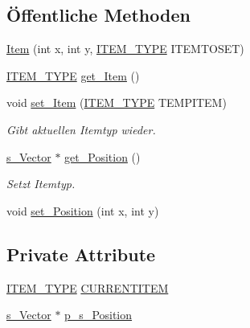\subsection*{Öffentliche Methoden}
\begin{DoxyCompactItemize}
\item 
\hyperlink{class_item_ae203ad5350de1aa73defd90973e055f0}{Item} (int x, int y, \hyperlink{globals_8h_a025279585f93967b0c7184f5b8597490}{I\-T\-E\-M\-\_\-\-T\-Y\-P\-E} I\-T\-E\-M\-T\-O\-S\-E\-T)
\item 
\hyperlink{globals_8h_a025279585f93967b0c7184f5b8597490}{I\-T\-E\-M\-\_\-\-T\-Y\-P\-E} \hyperlink{class_item_afcee83c2911215a53019b9182a37eb9f}{get\-\_\-\-Item} ()
\item 
void \hyperlink{class_item_a00a562954be3b3ce018676aea84d9a75}{set\-\_\-\-Item} (\hyperlink{globals_8h_a025279585f93967b0c7184f5b8597490}{I\-T\-E\-M\-\_\-\-T\-Y\-P\-E} T\-E\-M\-P\-I\-T\-E\-M)
\begin{DoxyCompactList}\small\item\em Gibt aktuellen Itemtyp wieder. \end{DoxyCompactList}\item 
\hyperlink{structs___vector}{s\-\_\-\-Vector} $\ast$ \hyperlink{class_item_a8fbd971dcad6d5bffb887657db6f1a68}{get\-\_\-\-Position} ()
\begin{DoxyCompactList}\small\item\em Setzt Itemtyp. \end{DoxyCompactList}\item 
void \hyperlink{class_item_a71772937c1e153dbef03e583be74215a}{set\-\_\-\-Position} (int x, int y)
\end{DoxyCompactItemize}
\subsection*{Private Attribute}
\begin{DoxyCompactItemize}
\item 
\hyperlink{globals_8h_a025279585f93967b0c7184f5b8597490}{I\-T\-E\-M\-\_\-\-T\-Y\-P\-E} \hyperlink{class_item_a9117dd45f611b341b4fa70beb5eed667}{C\-U\-R\-R\-E\-N\-T\-I\-T\-E\-M}
\item 
\hyperlink{structs___vector}{s\-\_\-\-Vector} $\ast$ \hyperlink{class_item_a684a594cd060d5106a0d03e1b45fc22d}{p\-\_\-s\-\_\-\-Position}
\end{DoxyCompactItemize}


